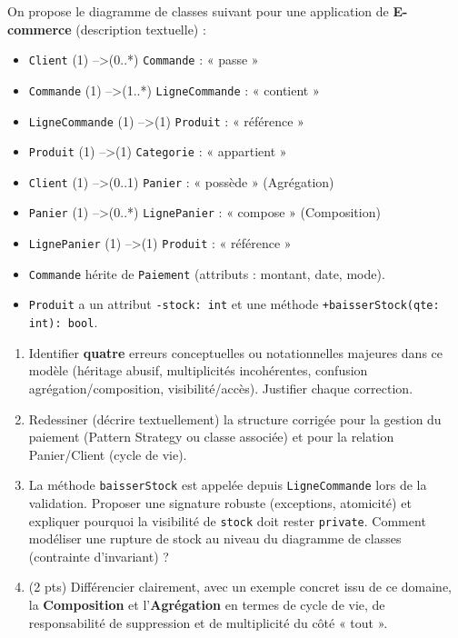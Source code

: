 \documentclass[11pt]{article}
\begin{document}
\begin{exercice}
On propose le diagramme de classes suivant pour une application de \textbf{E-commerce} (description textuelle) :
\begin{itemize}
    \item \texttt{Client} (1) --\textgreater (0..*) \texttt{Commande} : « passe »
    \item \texttt{Commande} (1) --\textgreater (1..*) \texttt{LigneCommande} : « contient »
    \item \texttt{LigneCommande} (1) --\textgreater (1) \texttt{Produit} : « référence »
    \item \texttt{Produit} (1) --\textgreater (1) \texttt{Categorie} : « appartient »
    \item \texttt{Client} (1) --\textgreater (0..1) \texttt{Panier} : « possède » (Agrégation)
    \item \texttt{Panier} (1) --\textgreater (0..*) \texttt{LignePanier} : « compose » (Composition)
    \item \texttt{LignePanier} (1) --\textgreater (1) \texttt{Produit} : « référence »
    \item \texttt{Commande} hérite de \texttt{Paiement} (attributs : montant, date, mode).
    \item \texttt{Produit} a un attribut \texttt{-stock: int} et une méthode \texttt{+baisserStock(qte: int): bool}.
\end{itemize}
\begin{enumerate}
    \item Identifier \textbf{quatre} erreurs conceptuelles ou notationnelles majeures dans ce modèle (héritage abusif, multiplicités incohérentes, confusion agrégation/composition, visibilité/accès). Justifier chaque correction.
    \item Redessiner (décrire textuellement) la structure corrigée pour la gestion du paiement (Pattern Strategy ou classe associée) et pour la relation Panier/Client (cycle de vie).
    \item La méthode \texttt{baisserStock} est appelée depuis \texttt{LigneCommande} lors de la validation. Proposer une signature robuste (exceptions, atomicité) et expliquer pourquoi la visibilité de \texttt{stock} doit rester \texttt{private}. Comment modéliser une rupture de stock au niveau du diagramme de classes (contrainte d'invariant) ?
    \item (2 pts) Différencier clairement, avec un exemple concret issu de ce domaine, la \textbf{Composition} et l'\textbf{Agrégation} en termes de cycle de vie, de responsabilité de suppression et de multiplicité du côté « tout ».
\end{enumerate}
\end{exercice}
\end{document}
